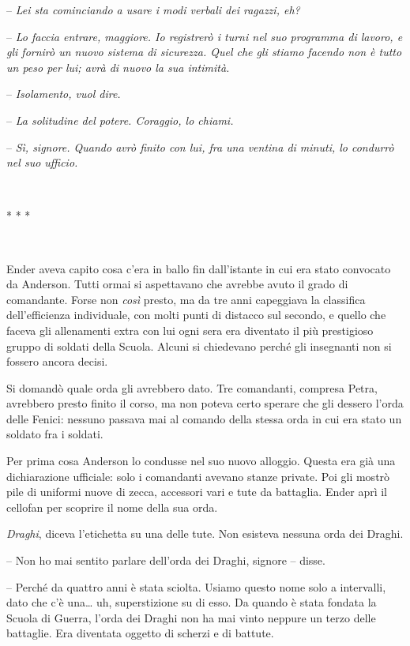 {-- \emph{Lei sta cominciando a usare i modi verbali dei ragazzi, eh?}}

{-- \emph{Lo faccia entrare, maggiore. Io registrerò i turni nel suo
		programma di lavoro, e gli fornirò un nuovo sistema di sicurezza. Quel
		che gli stiamo facendo non è tutto un peso per lui; avrà di nuovo la sua
		intimità.}}

{-- \emph{Isolamento, vuol dire.}}

{-- \emph{La solitudine del potere. Coraggio, lo chiami.}}

{-- \emph{Sì, signore. Quando avrò finito con lui, fra una ventina di
		minuti, lo condurrò nel suo ufficio.}}

{~}

\begin{center}
	{* * *}
\end{center}

{~}

{Ender aveva capito cosa c'era in ballo fin dall'istante in cui era
	stato convocato da Anderson. Tutti ormai si aspettavano che avrebbe
	avuto il grado di comandante. Forse non \emph{così} presto, ma da tre
	anni capeggiava la classifica dell'efficienza individuale, con molti
	punti di distacco sul secondo, e quello che faceva gli allenamenti extra
	con lui ogni sera era diventato il più prestigioso gruppo di soldati
	della Scuola. Alcuni si chiedevano perché gli insegnanti non si fossero
	ancora decisi.}

{Si domandò quale orda gli avrebbero dato. Tre comandanti, compresa
	Petra, avrebbero presto finito il corso, ma non poteva certo sperare che
	gli dessero l'orda delle Fenici: nessuno passava mai al comando della
	stessa orda in cui era stato un soldato fra i soldati.}

{Per prima cosa Anderson lo condusse nel suo nuovo alloggio. Questa era
	già una dichiarazione ufficiale: solo i comandanti avevano stanze
	private. Poi gli mostrò pile di uniformi nuove di zecca, accessori vari
	e tute da battaglia. Ender aprì il cellofan per scoprire il nome della
	sua orda.}

\emph{{Draghi}}{, \emph{} diceva l'etichetta su una delle tute. Non
	esisteva nessuna orda dei Draghi.}

{-- Non ho mai sentito parlare dell'orda dei Draghi, signore -- disse.}

{-- Perché da quattro anni è stata sciolta. Usiamo questo nome solo a
	intervalli, dato che c'è una\ldots{} uh, superstizione su di esso. Da
	quando è stata fondata la Scuola di Guerra, l'orda dei Draghi non ha mai
	vinto neppure un terzo delle battaglie. Era diventata oggetto di scherzi
	e di battute.}

